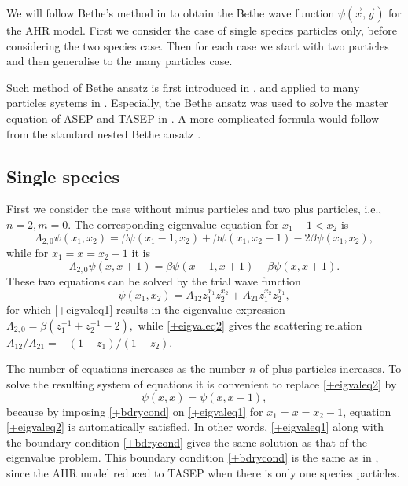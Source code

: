 \documentclass[cmp]{svjour}
\numberwithin{theorem}{section}
\numberwithin{equation}{section}
\begin{document}
We will follow Bethe's method in \cite{bethe} to obtain the Bethe wave function $\psi(\vec{x},\vec{y})$ for the AHR model. First we consider the case of single species particles only, before considering the two species case. Then for each case we start with two particles and then generalise to the many particles case.

Such method of Bethe ansatz is first introduced in \cite{bethe}, and applied to many particles systems in \cite{LL1963,Y2004,YY1966}. Especially, the Bethe ansatz was used to solve the master equation of ASEP and TASEP in \cite{GS1992,S1997}. A more complicated formula would follow from the standard nested Bethe ansatz \cite{C2008}.

\subsection{Single species}

First we consider the case without minus particles and two plus particles, i.e., $n=2,m=0$. The corresponding eigenvalue equation for $x_1+1<x_2$ is
\begin{equation}
\Lambda_{2,0} \psi(x_1,x_2)
=
\beta\psi(x_1-1,x_2) + \beta\psi(x_1,x_2-1) - 2\beta\psi(x_1,x_2),
\label{+eigvaleq1}
\end{equation}
while for $x_1=x=x_2-1$ it is
\begin{equation}
\Lambda_{2,0} \psi(x,x+1)
=
\beta\psi(x-1,x+1)-\beta\psi(x,x+1).
\label{+eigvaleq2}
\end{equation}
These two equations can be solved by the trial wave function $$\psi(x_1,x_2)=A_{12}z_1^{x_1}z_2^{x_2}+A_{21}z_1^{x_2}z_2^{x_1},$$ for which
\eqref{+eigvaleq1} results in the eigenvalue expression
$\Lambda_{2,0}=\beta(z_1^{-1}+z_2^{-1}-2),$ while \eqref{+eigvaleq2} gives the scattering relation $A_{12}/A_{21}=-(1-z_1)/(1-z_2)$.

The number of equations increases as the number $n$ of plus particles increases. To solve the resulting system of equations it is convenient to replace \eqref{+eigvaleq2} by
\begin{equation}
\psi(x,x)=\psi(x,x+1),
\label{+bdrycond}
\end{equation}
because by imposing \eqref{+bdrycond} on \eqref{+eigvaleq1} for $x_1=x=x_2-1$, equation \eqref{+eigvaleq2} is automatically satisfied. In other words, \eqref{+eigvaleq1} along with the boundary condition \eqref{+bdrycond} gives the same solution as that of the eigenvalue problem. This boundary condition \eqref{+bdrycond} is the same as in \cite{S1997}, since the AHR model reduced to TASEP when there is only one species particles.
\end{document}
